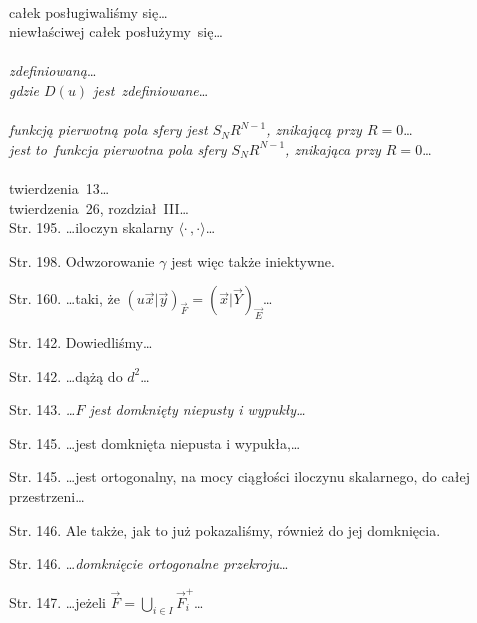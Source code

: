 \documentclass[a4paper,11pt]{article}
\begin{document}
 \\
\Jest całek posługiwaliśmy się\ldots \\
\Powin  niewłaściwej całek posłużymy~się\ldots \\
 \\
\Jest \emph{zdefiniowaną}\ldots \\
\Powin  \emph{gdzie $D( u )$ jest~zdefiniowane}\ldots \\
 \\
\Jest \emph{funkcją pierwotną pola sfery jest $S_{ N } R^{ N - 1 }$,
  znikającą przy $R = 0$}\ldots \\
\Powin \emph{jest to~funkcja pierwotna pola sfery
  $S_{ N } R^{ N - 1 }$,
  znikająca przy $R = 0$}\ldots \\
 \\
\Jest twierdzenia~13\ldots \\
\Powin twierdzenia~26, rozdział~III\ldots \\


















\start Str. 195. \ldots iloczyn skalarny
$\langle \cdot \,, \cdot \rangle$\ldots

\start Str. 198. Odwzorowanie $\gamma$ jest więc także iniektywne.

\start Str. 160. \ldots taki, że
$( u\vec{ x } | \vec{ y } )_{ \vec{ F } } = ( \vec{ x } | \vec{ Y }
)_{ \vec{ E } }$\ldots

\start Str. 142. Dowiedliśmy\ldots

\start Str. 142. \ldots dążą do $d^{ 2 }$\ldots

\start Str. 143. \emph{\ldots$F$ jest domknięty niepusty i
  wypukły\ldots}

\start Str. 145. \ldots jest domknięta niepusta i wypukła,\ldots

\start Str. 145. \ldots jest ortogonalny, na mocy ciągłości iloczynu
skalarnego, do całej przestrzeni\ldots

\start Str. 146. Ale także, jak to już pokazaliśmy, również do jej
domknięcia.

\start Str. 146. \ldots\emph{domknięcie ortogonalne przekroju}\ldots

\start Str. 147. \ldots jeżeli
$\vec{ F } = \bigcup_{ i \in I } \vec{ F }_{ i }^{ + }$\ldots
\end{document}
